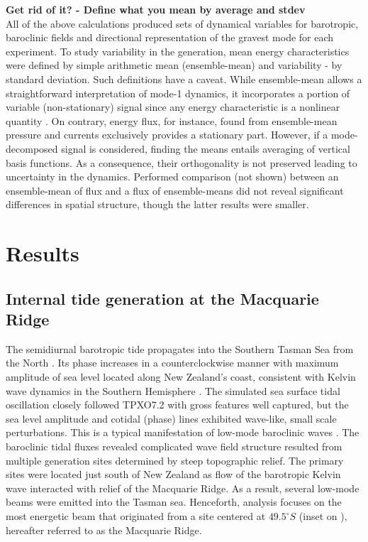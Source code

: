 \documentclass[12pt]{article}
\begin{document}
\textbf{Get rid of it? - Define what you mean by average and stdev}\\
All of the above calculations produced sets of dynamical variables for barotropic, baroclinic 
fields and directional representation of the gravest mode for each experiment. To study 
variability in the generation, mean energy characteristics were defined by simple arithmetic mean 
(ensemble-mean) and variability - by standard deviation. Such definitions have a caveat. 
While ensemble-mean allows a straightforward interpretation of mode-1 dynamics, it 
incorporates  
a portion of variable (non-stationary) signal since any energy characteristic is a nonlinear 
quantity \citep{zaron2014time}. On contrary, energy flux, for instance, found from ensemble-mean 
pressure and currents exclusively provides a stationary part. However, if a mode-decomposed signal 
is considered, finding the means entails averaging of vertical basis functions. As a 
consequence, their orthogonality is not preserved leading to uncertainty in the dynamics. 
Performed comparison (not shown) between an ensemble-mean of flux and a flux of ensemble-means did 
not reveal significant differences in spatial structure, though the latter results were smaller.

\newpage
\section{Results}
\label{C3.sec:main_res}
\subsection{Internal tide generation at the Macquarie Ridge}
The semidiurnal barotropic tide propagates into the Southern Tasman Sea from the North 
. Its phase increases in a counterclockwise manner with maximum amplitude of sea 
level located along New Zealand's coast, consistent with Kelvin wave dynamics in the Southern 
Hemisphere \citep{walters2001ocean}. The simulated sea surface tidal oscillation closely followed 
TPXO7.2 with 
gross 
features well captured, but the sea level amplitude and cotidal (phase) lines exhibited wave-like, 
small scale perturbations. This is a typical manifestation of low-mode baroclinic waves 
\citep{niwa2004three}. The baroclinic tidal fluxes  revealed complicated wave 
field structure resulted from 
multiple generation sites determined by steep topographic relief. The primary sites were located  
just south of New Zealand as flow of the barotropic Kelvin wave interacted with relief of the 
Macquarie Ridge. As a result, several low-mode beams \citep{rainville2010interference} were emitted 
into the Tasman 
sea. Henceforth, analysis focuses on the most energetic beam that originated from a site centered 
at 
$49.5^{\circ}S$ (inset on ), hereafter referred to as the Macquarie 
Ridge.\\
\end{document}
